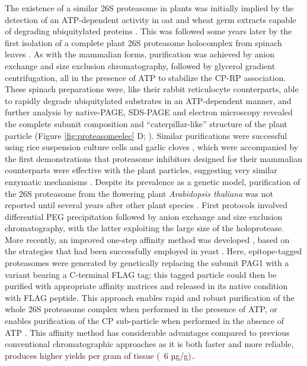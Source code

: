 	The existence of a similar 26S proteasome in plants was initially implied by the detection of an ATP-dependent activity in oat and wheat germ extracts capable of degrading ubiquitylated proteins \citep{hatfield89, vierstra88}.  This was followed some years later by the first isolation of a complete plant 26S proteasome holocomplex from spinach leaves \citep{fujinami94}.  As with the mammalian forms, purification was achieved by anion exchange and size exclusion chromatography, followed by glycerol gradient centrifugation, all in the presence of ATP to stabilize the CP-RP association.  These spinach preparations were, like their rabbit reticulocyte counterparts, able to rapidly degrade ubiquitylated substrates in an ATP-dependent manner, and further analysis by native-PAGE, SDS-PAGE and electron microscopy revealed the complete subunit composition and ``caterpillar-like'' structure of the plant particle (Figure \ref{fig:proteasomeelec} D; \citep{fujinami94}).  Similar purifications were successful using rice suspension culture cells and garlic cloves \citep{malik04, yanagawa99}, which were accompanied by the first demonstrations that proteasome inhibitors designed for their mammalian counterparts were effective with the plant particles, suggesting very similar enzymatic mechanisms \citep{ozaki92, woffenden98}.
	Despite its prevalence as a genetic model, purification of the 26S proteasome from the flowering plant \textit{Arabidopsis thaliana} was not reported until several years after other plant species \citep{yang04}.  First protocols involved differential PEG precipitation followed by anion exchange and size exclusion chromatography, with the latter exploiting the large size of the holoprotease.  More recently, an improved one-step affinity method was developed \citep{book10}, based on the strategies that had been successfully employed in yeast \citep{leggett05}.  Here, epitope-tagged proteasomes were generated by genetically replacing the subunit PAG1 with a variant bearing a C-terminal FLAG tag; this tagged particle could then be purified with appropriate affinity matrices and released in its native condition with FLAG peptide.  This approach enables rapid and robust purification of the whole 26S proteasome complex when performed in the presence of ATP, or enables purification of the CP sub-particle when performed in the absence of ATP \citep{book10}. This affinity method has considerable advantages compared to previous conventional chromatographic approaches \citep{yang04} as it is both faster and more reliable, produces higher yields per gram of tissue (~6 µg/g)..

